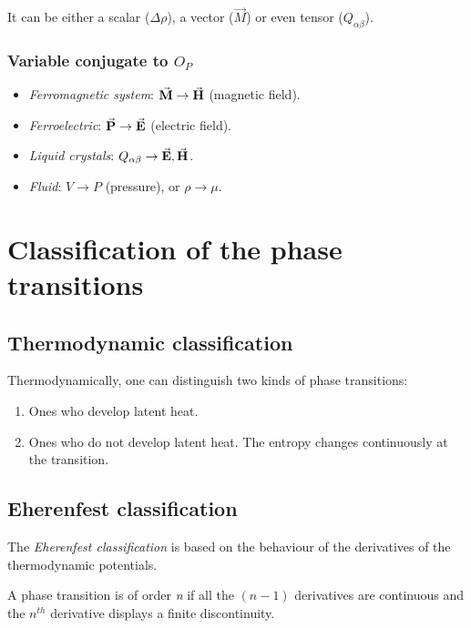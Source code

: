 \documentclass[../../Main/Main.tex]{subfiles}
\begin{document}
It can be either a scalar ($\Delta \rho$), a vector ($\Vec{M}$) or even tensor ($Q_{\alpha \beta}$).
\subsubsection{Variable conjugate to \( O_P \)}
\begin{itemize}
\item \emph{Ferromagnetic system}: \( \va{M} \rightarrow \va{H}   \) (magnetic field).
\item \emph{Ferroelectric}: \( \va{P} \rightarrow \va{E}   \)  (electric field).
\item \emph{Liquid crystals}: \( Q_{\alpha \beta } \rightarrow \va{E},\va{H}   \).
\item \emph{Fluid}: \( V \rightarrow P \) (pressure), or \( \rho \rightarrow \mu  \).
\end{itemize}









\section{Classification of the phase transitions}

\subsection{Thermodynamic classification}
Thermodynamically, one can distinguish two kinds of phase transitions:
\begin{enumerate}
\item Ones who develop latent heat.
\item Ones who do not develop latent heat. The entropy changes continuously at the transition.
\end{enumerate}
\subsection{Eherenfest classification}
The \emph{Eherenfest classification} is based on the behaviour of the derivatives of the thermodynamic potentials.

A phase transition is of order \emph{n} if all the \( (n-1) \)  derivatives are continuous and the \( n^{th} \) derivative displays a finite discontinuity.
\end{document}

